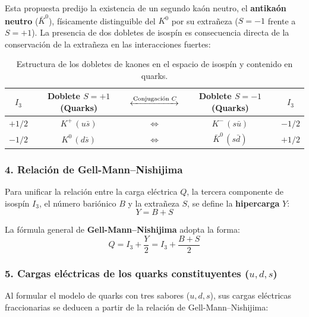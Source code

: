 Esta propuesta predijo la existencia de un segundo kaón neutro, el \textbf{antikaón neutro} ($\bar{K}^0$), físicamente distinguible del $K^0$ por su extrañeza ($S = -1$ frente a $S = +1$). La presencia de dos dobletes de isospín es consecuencia directa de la conservación de la extrañeza en las interacciones fuertes:

\begin{table}[htbp]
    \centering
    \begin{tabular}{c c c c c}
        \toprule
        $I_3$ & Doblete $S = +1$ (Quarks) & $\xleftrightarrow{\text{Conjugación } C}$ & Doblete $S = -1$ (Quarks) & $I_3$ \\
        \midrule
        $+1/2$ & $K^+ \, (u\bar{s})$ & $\iff$ & $K^- \, (s\bar{u})$ & $-1/2$ \\
        $-1/2$ & $K^0 \, (d\bar{s})$ & $\iff$ & $\bar{K}^0 \, (s\bar{d})$ & $+1/2$ \\
        \bottomrule
    \end{tabular}
    \caption{Estructura de los dobletes de kaones en el espacio de isospín y contenido en quarks.}
    \label{tab:dobletes_kaones}
\end{table}

\subsubsection*{4. Relación de Gell-Mann--Nishijima}

Para unificar la relación entre la carga eléctrica $Q$, la tercera componente de isospín $I_3$, el número bariónico $B$ y la extrañeza $S$, se define la \textbf{hipercarga} $Y$:
\begin{equation}
    Y = B + S
\end{equation}

La fórmula general de \textbf{Gell-Mann--Nishijima} adopta la forma:
\begin{equation}
    Q = I_3 + \frac{Y}{2} = I_3 + \frac{B + S}{2}
\end{equation}

\subsubsection*{5. Cargas eléctricas de los quarks constituyentes ($u, d, s$)}

Al formular el modelo de quarks con tres sabores ($u, d, s$), sus cargas eléctricas fraccionarias se deducen a partir de la relación de Gell-Mann--Nishijima:

